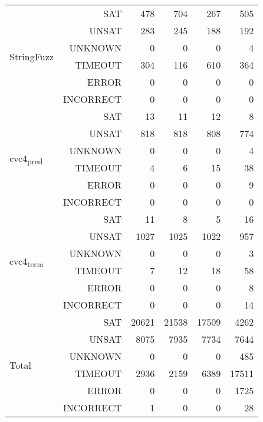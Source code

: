 \begin{table}[h]
{{\begin{tabular}{|l r | r r r r |}
\multirow{6}{*}{StringFuzz}	& SAT      &   478&   704&   267&   505 \\
							& UNSAT    &   283&   245&   188&   192 \\
							& UNKNOWN  &     0&     0&     0&     4 \\
							& TIMEOUT  &   304&   116&   610&   364 \\
							& ERROR    &     0&     0&     0&     0 \\
							& INCORRECT&     0&     0&     0&     0 \\\hline
\multirow{6}{*}{cvc4\textsubscript{pred}} & SAT &    13&    11&    12&     8 \\
							& UNSAT    &   818&   818&   808&   774 \\
							& UNKNOWN  &     0&     0&     0&     4 \\
							& TIMEOUT  &     4&     6&    15&    38 \\
							& ERROR    &     0&     0&     0&     9 \\
							& INCORRECT&     0&     0&     0&     0 \\ \hline
\multirow{6}{*}{cvc4\textsubscript{term}} & SAT &    11&     8&     5&    16 \\
							& UNSAT    &  1027&  1025&  1022&   957 \\
							& UNKNOWN  &     0&     0&     0&     3 \\
							& TIMEOUT  &     7&    12&    18&    58 \\
							& ERROR    &     0&     0&     0&     8 \\
							& INCORRECT&     0&     0&     0&    14 \\ \hline \hline
\multirow{6}{*}{Total} 		& SAT      & 20621& 21538& 17509&  4262 \\
							& UNSAT    &  8075&  7935&  7734&  7644 \\
							& UNKNOWN  &     0&     0&     0&   485 \\
							& TIMEOUT  &  2936&  2159&  6389& 17511 \\
							& ERROR    &     0&     0&     0&  1725 \\
							& INCORRECT&     1&     0&     0&    28 \\\hline
\end{tabular}}
\label{table:base_benchmark}}
\end{table}

